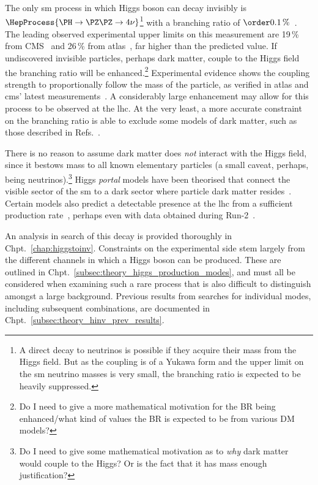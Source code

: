 The only \acrshort{sm} process in which Higgs boson can decay invisibly is $\HepProcess{\PH \to \PZ\PZ \to 4\nu}$\footnote{A direct decay to neutrinos is possible if they acquire their mass from the Higgs field. But as the coupling is of a Yukawa form and the upper limit on the \acrshort{sm} neutrino masses is very small, the branching ratio is expected to be heavily suppressed.} with a branching ratio of $\order{\text{0.1\,\%}}$~\cite{Heinemeyer:1559921}. The leading observed experimental upper limits on this measurement are 19\,\% from CMS~\cite{Sirunyan:2018owy} and 26\,\% from \acrshort{atlas}~\cite{Aaboud:2019rtt}, far higher than the predicted value. If undiscovered invisible particles, perhaps dark matter, couple to the Higgs field the branching ratio will be enhanced.\footnote{Do I need to give a more mathematical motivation for the BR being enhanced/what kind of values the BR is expected to be from various DM models?} Experimental evidence shows the coupling strength to proportionally follow the mass of the particle, as verified in \acrshort{atlas} and \acrshort{cms}' latest measurements~\cite{Sopczak:2708121}. A considerably large enhancement may allow for this process to be observed at the \acrshort{lhc}. At the very least, a more accurate constraint on the branching ratio is able to exclude some models of dark matter, such as those described in Refs.~.

There is no reason to assume dark matter does \emph{not} interact with the Higgs field, since it bestows mass to all known elementary particles (a small caveat, perhaps, being neutrinos).\footnote{Do I need to give some mathematical motivation as to \emph{why} dark matter would couple to the Higgs? Or is the fact that it has mass enough justification?} Higgs \emph{portal} models have been theorised that connect the visible sector of the \acrlong{sm} to a dark sector where particle dark matter resides~\cite{higgs_portal_singlet_dm,Arcadi:2019lka}. Certain models also predict a detectable presence at the \acrshort{lhc} from a sufficient production rate~\cite{Boveia:2018yeb}, perhaps even with data obtained during Run-2~\cite{Abercrombie:2015wmb}.


An analysis in search of this decay is provided thoroughly in Chpt.~\ref{chap:higgstoinv}. Constraints on the experimental side stem largely from the different channels in which a Higgs boson can be produced. These are outlined in Chpt.~\ref{subsec:theory_higgs_production_modes}, and must all be considered when examining such a rare process that is also difficult to distinguish amongst a large background. Previous results from searches for individual modes, including subsequent combinations, are documented in Chpt.~\ref{subsec:theory_hinv_prev_results}.


